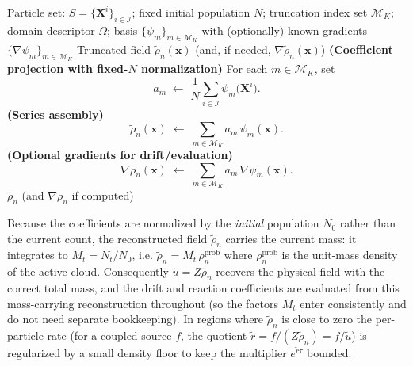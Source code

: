 \documentclass[a4paper,fleqn]{cas-sc}
\theoremstyle{definition}
\theoremstyle{remark}
\begin{document}
\begin{algorithm}
\caption{Interpolation Step (fixed-$N$ normalization)}\label{alg:interpolate}
\begin{algorithmic}
\Require Particle set: $S=\{ \mathbf{X}^i \}_{i\in \mathcal{I}}$; fixed initial population $N$; truncation index set $\mathcal{M}_K$; domain descriptor $\Omega$; basis $\{\psi_m\}_{m\in\mathcal{M}_K}$ with (optionally) known gradients $\{\nabla\psi_m\}_{m\in\mathcal{M}_K}$
\Ensure Truncated field $\tilde{\rho}_n(\mathbf{x})$ (and, if needed, $\nabla\tilde{\rho}_n(\mathbf{x})$)
    \State \textbf{(Coefficient projection with fixed-$N$ normalization)}
    \State For each $m\in\mathcal{M}_K$, set
    \[
      a_m \;\gets\; \frac{1}{N}\sum_{i\in\mathcal{I}} \psi_m\!\big(\mathbf{X}^i\big).
    \]
    \State \textbf{(Series assembly)}
    \[
      \tilde{\rho}_n(\mathbf{x}) \;\gets\; \sum_{m\in\mathcal{M}_K} a_m\,\psi_m(\mathbf{x}).
    \]
    \State \textbf{(Optional gradients for drift/evaluation)}
      \[
        \nabla\tilde{\rho}_n(\mathbf{x}) \;\gets\; \sum_{m\in\mathcal{M}_K} a_m\,\nabla\psi_m(\mathbf{x}).
      \]
    \EndIf
    \State \Return $\tilde{\rho}_n$ (and $\nabla\tilde{\rho}_n$ if computed)
\EndProcedure
\end{algorithmic}
\end{algorithm}

Because the coefficients are normalized by the \emph{initial} population $N_0$ rather than the current count,
the reconstructed field $\tilde\rho_n$ carries the current mass: it integrates to $M_t=N_t/N_0$, i.e.
$\tilde\rho_n = M_t\,\rho_n^{\mathrm{prob}}$ where $\rho_n^{\mathrm{prob}}$ is the unit-mass density of the active
cloud. Consequently $\tilde u = Z\tilde\rho_n$ recovers the physical field with the correct total mass, and the
drift and reaction coefficients are evaluated from this mass-carrying reconstruction throughout (so the factors
$M_t$ enter consistently and do not need separate bookkeeping). In regions where $\tilde\rho_n$ is close to zero
the per-particle rate (for a coupled source $f$, the quotient $\tilde r=f/(Z\tilde\rho_n)=f/\tilde u$) is regularized by a small density floor to keep the multiplier $e^{\tilde r\tau}$ bounded.
\end{document}
